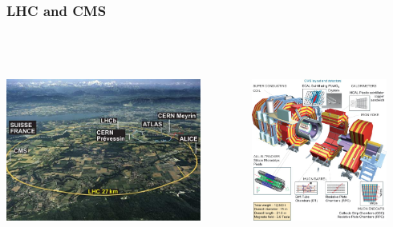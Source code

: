 \documentclass{beamer}
\begin{document}
\begin{frame}
 \frametitle{LHC and CMS}
 \begin{minipage}[t]{0.85\paperwidth}
  \begin{columns}
   \begin{column}{0.50\linewidth}
 \begin{tcolorbox}[colback=UNL@Cream!5,colframe=UNL@Cream!60,title=\textcolor{UMN@Maroon}{\textbf{LHC}}]
    \includegraphics[height=7cm,width=0.85\textwidth]{THESISPLOTS/lhc-ring-aerial_2.jpg}
    \end{tcolorbox}
   \end{column}
   \begin{column}{0.50\linewidth}
   \begin{tcolorbox}[colback=UNL@Cream!5,colframe=UNL@Cream!60,title=\textcolor{UMN@Maroon}{\textbf{CMS Detector}}]
    \includegraphics[height=7cm,width=0.85\textwidth]{THESISPLOTS/CMS_LAYOUT_AND_DETECTORS.jpg}
  \end{tcolorbox}
  \end{column}
 \end{columns}
 \end{minipage}
\end{frame}
\end{document}
